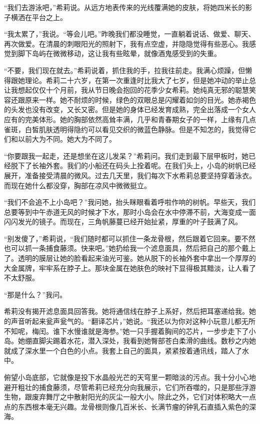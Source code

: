 \documentclass[AutoFakeBold=true]{book}
\begin{document}
``我们去游泳吧，''希莉说。从远方地表传来的光线覆满她的皮肤，将她四米长的影子横洒在平台之上。

``我太累了，''我说。``等会儿吧。''昨晚我们都没睡觉，一直躺着说话、做爱、聊天、再次做爱。在清晨的刺眼阳光的照射下，我有点空虚，并隐隐觉得有些恶心。我感觉到脚下岛屿在微微移动，这让我有些眩晕，就像酒鬼感受到的失重。

``不要，我们现在就去。''希莉说着，抓住我的手，拉我往前走。我满心烦躁，但懒得跟她理论。希莉二十六岁，在第一次重逢时比我大了七岁，但是她冲动的举止总让我想起仅仅十个月前，我从节日晚会抱回的花季少女希莉。她纯真无邪的聪慧笑容还跟原来一样。她不耐烦的时候，绿色的双眼总是闪耀着如剑的目光。她赤褐色的头发也没有改变，又长又密。但是她的身体已经发育成熟，完全出落成一个女人应有的完美体形。她的胸部依然高耸丰满，几乎和青春期女子的一样，上缘有几点雀斑，白皙肌肤透明得隐约可以看见交织的微蓝色静脉。但是不知怎的，我觉得它们和以前大为不同。她大为不同了。

``你要跟我一起走，还是想坐在这儿发呆？''希莉问。我们走到最下层甲板时，她已经脱下了长袖外套。我们的小船还在码头上拴着呢。在我们头上，小岛的树帆已经展开，准备接受清晨的微风。过去几天里，我们每次下水希莉总要坚持穿着泳衣。而现在她什么都没穿，胸部在凉风中微微挺立。

``我们不会追不上小岛吧？''我问她，抬头眯眼看着呼啦作响的树帆。早些天，我们总要等到中午赤道无风的时候才下水，那时小岛会在水中停滞不前，大海变成一面闪闪发光的镜子。而现在，三角帆藤蔓已经开始扯紧，厚重的叶子鼓满了风。

``别发傻了，''希莉说，``我们随时都可以抓住一条龙骨根，然后跟着它回来。要不然也可以抓一条捕食藤须。快来吧。''她扔给我一个滤息面具，然后把自己的那个戴上了。透明的膜层让她的脸看起来油光可鉴。她从脱下的长袖外套中拿出一个厚厚的大金属牌，牢牢系在脖子上。那块金属在她肤色的映衬下显得极其黯淡，让人看了不太舒服。

``那是什么？''我问。

希莉没有揭开滤息面具回答我。她将通信线在脖子上系好，然后把耳塞递给我。她的声音听起来瓮声瓮气的。``翻译芯片，''她说。``我还以为你对这种小玩意儿都无所不知呢，梅闰。谁下水慢谁就是海参。''她一只手握着胸间的芯片，一步步走下了小岛。她绷直脚尖踢着水花，潜入深处，我看到她臀部苍白柔滑的曲线。数秒之内她就成了深水里一个白色的小点。我套上自己的面具，紧紧按着通讯线，踏人了水中。

俯望小岛底部，它就像是投下水晶般光芒的天穹里一颗暗淡的污点。我十分小心地避开粗壮的捕食藤须，尽管希莉已经充分向我展示，它们所吞噬的，只是那些浮游生物，跟废弃舞厅之中散射阳光的灰尘一般大小。除此之外，它们对体积略大一点点的东西根本毫无兴趣。龙骨根则像几百米长、长满节瘤的钟乳石直插入紫色的深海。
\end{document}
